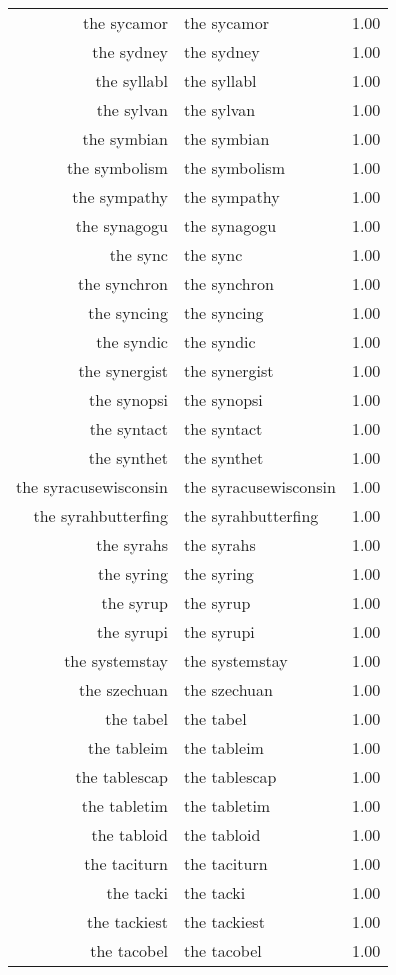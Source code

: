 \begin{table}[ht]
\begin{tabular}{rlr}
  the sycamor & the sycamor & 1.00 \\ 
  the sydney & the sydney & 1.00 \\ 
  the syllabl & the syllabl & 1.00 \\ 
  the sylvan & the sylvan & 1.00 \\ 
  the symbian & the symbian & 1.00 \\ 
  the symbolism & the symbolism & 1.00 \\ 
  the sympathy & the sympathy & 1.00 \\ 
  the synagogu & the synagogu & 1.00 \\ 
  the sync & the sync & 1.00 \\ 
  the synchron & the synchron & 1.00 \\ 
  the syncing & the syncing & 1.00 \\ 
  the syndic & the syndic & 1.00 \\ 
  the synergist & the synergist & 1.00 \\ 
  the synopsi & the synopsi & 1.00 \\ 
  the syntact & the syntact & 1.00 \\ 
  the synthet & the synthet & 1.00 \\ 
  the syracusewisconsin & the syracusewisconsin & 1.00 \\ 
  the syrahbutterfing & the syrahbutterfing & 1.00 \\ 
  the syrahs & the syrahs & 1.00 \\ 
  the syring & the syring & 1.00 \\ 
  the syrup & the syrup & 1.00 \\ 
  the syrupi & the syrupi & 1.00 \\ 
  the systemstay & the systemstay & 1.00 \\ 
  the szechuan & the szechuan & 1.00 \\ 
  the tabel & the tabel & 1.00 \\ 
  the tableim & the tableim & 1.00 \\ 
  the tablescap & the tablescap & 1.00 \\ 
  the tabletim & the tabletim & 1.00 \\ 
  the tabloid & the tabloid & 1.00 \\ 
  the taciturn & the taciturn & 1.00 \\ 
  the tacki & the tacki & 1.00 \\ 
  the tackiest & the tackiest & 1.00 \\ 
  the tacobel & the tacobel & 1.00 \\ 

\end{tabular}
\end{table}
